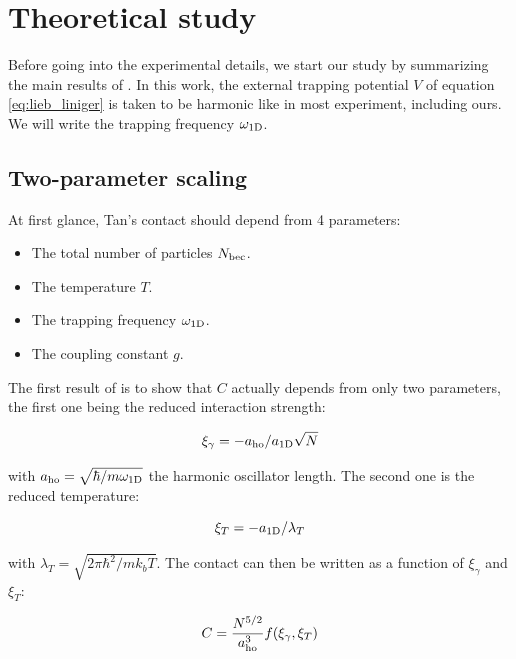 \section{Theoretical study}

\label{sec:1D_theory}

Before going into the experimental details, we start our study by summarizing the main results of \cite{yao2018tan}. In this work, the external trapping potential $V$ of equation \ref{eq:lieb_liniger} is taken to be harmonic like in most experiment, including ours. We will write the trapping frequency $\omega_{\rm{1D}}$. 

\subsection{Two-parameter scaling}

At first glance, Tan's contact should depend from 4 parameters:

\begin{itemize}
    \item The total number of particles $N_{\rm{bec}}$.
    \item The temperature $T$.
    \item The trapping frequency $\omega_{\rm{1D}}$.
    \item The coupling constant $g$.
\end{itemize}

\noindent The first result of \cite{yao2018tan} is to show that $C$ actually depends from only two parameters, the first one being the reduced interaction strength:

\begin{equation}
    \xi_{\gamma}=-a_{\rm{ho}}/a_{\rm{1D}}\sqrt{N}
    \label{eq:xi_gamma}
\end{equation}

\noindent with $a_{\rm{ho}}=\sqrt{\hbar/m \omega_{\rm{1D}}}$ the harmonic oscillator length. The second one is the reduced temperature:

\begin{equation}
    \xi_T=-a_{\rm{1D}}/\lambda_T
\end{equation}

\noindent with $\lambda_T=\sqrt{2\pi \hbar^2/m k_b T}$. The contact can then be written as a function of $\xi_{\gamma}$ and $\xi_{T}$:

\begin{equation}
    C= \frac{N^{5/2}}{a_{\rm{ho}}^3} f(\xi_{\gamma},\xi_{T})
\end{equation}


